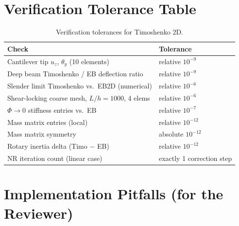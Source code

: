 \documentclass[11pt,a4paper]{article}
\begin{document}
\section{Verification Tolerance Table}

\begin{table}[h!]
\centering
\begin{tabular}{l l}
\toprule
Check & Tolerance \\
\midrule
Cantilever tip $u_z$, $\theta_y$ (10 elements) & relative $10^{-9}$ \\
Deep beam Timoshenko / EB deflection ratio     & relative $10^{-9}$ \\
Slender limit Timoshenko vs.\ EB2D (numerical) & relative $10^{-6}$ \\
Shear-locking coarse mesh, $L/h = 1000$, 4 elems & relative $10^{-6}$ \\
$\Phi \to 0$ stiffness entries vs.\ EB         & relative $10^{-7}$ \\
Mass matrix entries (local)                    & relative $10^{-12}$ \\
Mass matrix symmetry                           & absolute $10^{-12}$ \\
Rotary inertia delta (Timo $-$ EB)             & relative $10^{-12}$ \\
NR iteration count (linear case)               & exactly 1 correction step \\
\bottomrule
\end{tabular}
\caption{Verification tolerances for Timoshenko 2D.}
\end{table}

\section{Implementation Pitfalls (for the Reviewer)}
\end{document}
